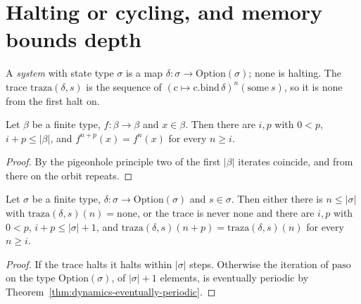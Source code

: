 \section{Halting or cycling, and memory bounds depth}
\label{sec:dynamics-halt-cycle}

A \emph{system} with state type $\sigma$ is a map $\delta : \sigma \to \mathrm{Option}(\sigma)$;
$\mathrm{none}$ is halting. The trace $\mathrm{traza}(\delta, s)$ is the sequence of
$(\mathrm{c} \mapsto \mathrm{c.bind}\,\delta)^{n}(\mathrm{some}\ s)$, so it is $\mathrm{none}$ from
the first halt on.

\begin{theorem}
  \label{thm:dynamics-eventually-periodic}
  \leanok
  Let $\beta$ be a finite type, $f : \beta \to \beta$ and $x \in \beta$. Then there are $i, p$ with
  $0 < p$, $i + p \le |\beta|$, and $f^{n+p}(x) = f^{n}(x)$ for every $n \ge i$.
  \own{}
\end{theorem}

\begin{proof}
  \leanok
  By the pigeonhole principle two of the first $|\beta|$ iterates coincide, and from there on the
  orbit repeats.
\end{proof}

\begin{theorem}
  \label{thm:dynamics-halt-or-cycle}
  \leanok
  Let $\sigma$ be a finite type, $\delta : \sigma \to \mathrm{Option}(\sigma)$ and $s \in \sigma$.
  Then either there is $n \le |\sigma|$ with $\mathrm{traza}(\delta, s)(n) = \mathrm{none}$, or the
  trace is never $\mathrm{none}$ and there are $i, p$ with $0 < p$, $i + p \le |\sigma| + 1$, and
  $\mathrm{traza}(\delta, s)(n + p) = \mathrm{traza}(\delta, s)(n)$ for every $n \ge i$.
  \own{}
\end{theorem}

\begin{proof}
  \leanok
  If the trace halts it halts within $|\sigma|$ steps. Otherwise the iteration of $\mathrm{paso}$ on
  the type $\mathrm{Option}(\sigma)$, of $|\sigma| + 1$ elements, is eventually periodic by
  Theorem~\ref{thm:dynamics-eventually-periodic}.
\end{proof}

